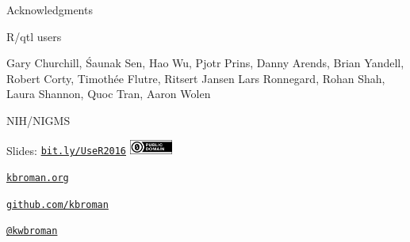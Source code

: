 \documentclass[12pt,t]{beamer}
\begin{document}
\begin{frame}[c]{Acknowledgments}

  \bbi
\item R/qtl users
  \item Gary Churchill, \'Saunak Sen, Hao Wu, Pjotr Prins, Danny
    Arends, Brian Yandell, Robert Corty, Timoth\'ee Flutre, Ritsert Jansen
  Lars Ronnegard, Rohan Shah, Laura Shannon, Quoc Tran, Aaron
  Wolen
\item NIH/NIGMS
\ei



\end{frame}




\begin{frame}[c]{}

\Large

Slides: \href{http://bit.ly/UseR2016}{\tt bit.ly/UseR2016} \quad
\includegraphics[height=5mm]{Figs/cc-zero.png}

\vspace{10mm}

\href{http://kbroman.org}{\tt kbroman.org}

\vspace{10mm}

\href{https://github.com/kbroman}{\tt github.com/kbroman}

\vspace{10mm}

\href{https://twitter.com/kwbroman}{\tt @kwbroman}


\end{frame}
\end{document}
